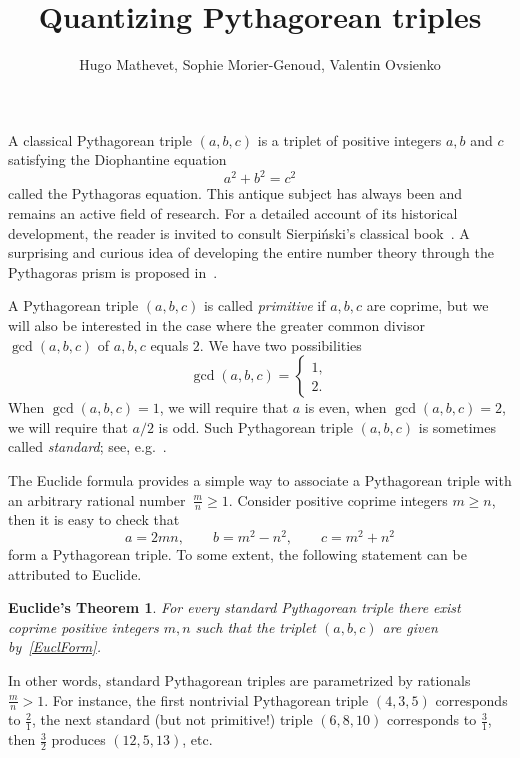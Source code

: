 \documentclass{article}[12pt]
\title{Quantizing Pythagorean triples}
\author{
Hugo Mathevet,
Sophie Morier-Genoud, %
Valentin Ovsienko}
\date{}
\theoremstyle{plain}
\newtheorem*{thmE}{Euclide's Theorem}
\theoremstyle{definition}
\begin{document}
\maketitle

A classical Pythagorean triple $(a,b,c)$ is a triplet
of positive integers $a,b$ and $c$ satisfying the Diophantine equation 
$$
a^2+b^2=c^2
$$
called the Pythagoras equation.
This antique subject has always been and remains an active field of research.
For a detailed account of its historical development,
the reader is invited to consult
Sierpi\'nski's classical book~\cite{Sie}.
A surprising and curious idea of developing the entire number theory through the 
Pythagoras prism is proposed in~\cite{Tak}.

A Pythagorean triple $(a,b,c)$ is called {\it primitive} if $a,b,c$ are coprime,
but we will also be interested in the case where the greater common divisor
$\gcd(a,b,c)$ of $a,b,c$ equals $2$.
We have two possibilities
$$
\gcd(a,b,c)=
\left\{
\begin{array}{l}
1,\\
2.
\end{array}
\right.
$$
When $\gcd(a,b,c)=1$, we will require that $a$ is even, 
when $\gcd(a,b,c)=2$, we will require that $a/2$ is odd.
Such Pythagorean triple $(a,b,c)$ is sometimes called {\it standard}; see, e.g.~\cite{Tra}.

The Euclide formula provides a simple way to associate a Pythagorean triple
with an arbitrary rational number~$\frac{m}{n}\geq1$.
Consider positive coprime integers $m\geq n$, then it is easy to check that
\begin{equation}
\label{EuclForm}
a=2mn,
\qquad
b=m^2-n^2,
\qquad
c=m^2+n^2
\end{equation}
form a Pythagorean triple.
To some extent, the following statement can be attributed to Euclide.

\begin{thmE}
\label{ClassThm}
For every standard Pythagorean triple
there exist coprime positive integers $m,n$ such that 
the triplet $(a,b,c)$ are given by~\eqref{EuclForm}.
\end{thmE}

In other words, standard Pythagorean triples are parametrized by rationals~$\frac{m}{n}>1$.
For instance, 
the first nontrivial Pythagorean triple $(4,3,5)$ corresponds to $\frac{2}{1}$,
the next standard (but not primitive!) triple $(6,8,10)$ corresponds to $\frac{3}{1}$,
then  $\frac{3}{2}$ produces $(12,5,13)$, etc.
\end{document}
